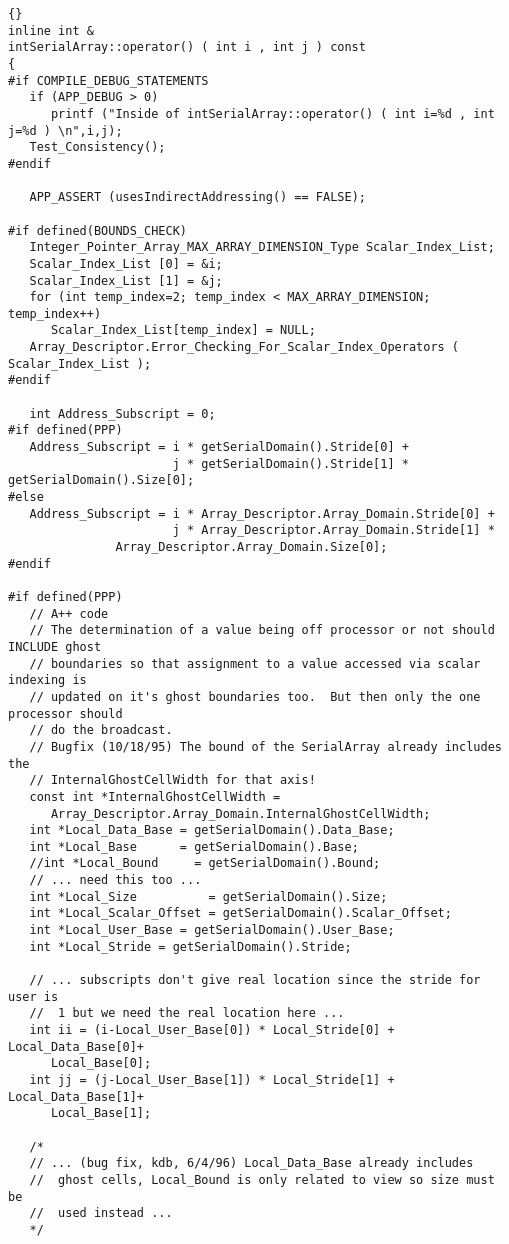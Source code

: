 \documentclass[10pt]{llncs}
\begin{document}
\begin{lstlisting}{}
inline int & 
intSerialArray::operator() ( int i , int j ) const
{
#if COMPILE_DEBUG_STATEMENTS
   if (APP_DEBUG > 0)
      printf ("Inside of intSerialArray::operator() ( int i=%d , int j=%d ) \n",i,j);
   Test_Consistency();
#endif

   APP_ASSERT (usesIndirectAddressing() == FALSE);

#if defined(BOUNDS_CHECK)
   Integer_Pointer_Array_MAX_ARRAY_DIMENSION_Type Scalar_Index_List;
   Scalar_Index_List [0] = &i;
   Scalar_Index_List [1] = &j;
   for (int temp_index=2; temp_index < MAX_ARRAY_DIMENSION; temp_index++)
      Scalar_Index_List[temp_index] = NULL;
   Array_Descriptor.Error_Checking_For_Scalar_Index_Operators ( Scalar_Index_List );
#endif

   int Address_Subscript = 0;
#if defined(PPP)
   Address_Subscript = i * getSerialDomain().Stride[0] + 
                       j * getSerialDomain().Stride[1] * getSerialDomain().Size[0];
#else
   Address_Subscript = i * Array_Descriptor.Array_Domain.Stride[0] + 
                       j * Array_Descriptor.Array_Domain.Stride[1] * 
		       Array_Descriptor.Array_Domain.Size[0];
#endif

#if defined(PPP)
   // A++ code
   // The determination of a value being off processor or not should INCLUDE ghost 
   // boundaries so that assignment to a value accessed via scalar indexing is 
   // updated on it's ghost boundaries too.  But then only the one processor should 
   // do the broadcast.
   // Bugfix (10/18/95) The bound of the SerialArray already includes the 
   // InternalGhostCellWidth for that axis!
   const int *InternalGhostCellWidth = 
      Array_Descriptor.Array_Domain.InternalGhostCellWidth;
   int *Local_Data_Base = getSerialDomain().Data_Base;
   int *Local_Base      = getSerialDomain().Base;
   //int *Local_Bound     = getSerialDomain().Bound;
   // ... need this too ...
   int *Local_Size          = getSerialDomain().Size;
   int *Local_Scalar_Offset = getSerialDomain().Scalar_Offset;
   int *Local_User_Base = getSerialDomain().User_Base;
   int *Local_Stride = getSerialDomain().Stride;

   // ... subscripts don't give real location since the stride for user is
   //  1 but we need the real location here ...
   int ii = (i-Local_User_Base[0]) * Local_Stride[0] + Local_Data_Base[0]+
      Local_Base[0];
   int jj = (j-Local_User_Base[1]) * Local_Stride[1] + Local_Data_Base[1]+
      Local_Base[1];

   /*
   // ... (bug fix, kdb, 6/4/96) Local_Data_Base already includes
   //  ghost cells, Local_Bound is only related to view so size must be
   //  used instead ...
   */


\end{lstlisting}
\end{document}
